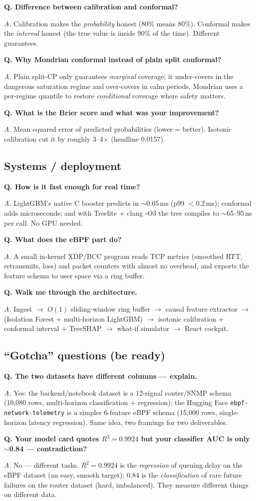 \documentclass[11pt,a4paper]{article}
\newcommand{\Q}[1]{\vspace{4pt}\noindent\textbf{Q. #1}\par\nopagebreak}
\newcommand{\A}[1]{\noindent\textit{A.} #1\par}
\begin{document}
\Q{Difference between calibration and conformal?}
\A{Calibration makes the \emph{probability} honest (80\% means 80\%). Conformal makes the \emph{interval}
honest (the true value is inside 90\% of the time). Different guarantees.}

\Q{Why Mondrian conformal instead of plain split conformal?}
\A{Plain split-CP only guarantees \emph{marginal} coverage; it under-covers in the dangerous saturation regime
and over-covers in calm periods. Mondrian uses a per-regime quantile to restore \emph{conditional} coverage
where safety matters.}

\Q{What is the Brier score and what was your improvement?}
\A{Mean squared error of predicted probabilities (lower = better). Isotonic calibration cut it by roughly
3--4$\times$ (headline 0.0157).}

\subsection{Systems / deployment}
\Q{How is it fast enough for real time?}
\A{LightGBM's native C booster predicts in $\sim$0.05\,ms (p99 $<$0.2\,ms); conformal adds microseconds;
and with Treelite + clang -O3 the tree compiles to $\sim$65--95\,ns per call. No GPU needed.}

\Q{What does the eBPF part do?}
\A{A small in-kernel XDP/BCC program reads TCP metrics (smoothed RTT, retransmits, loss) and packet counters
with almost no overhead, and exports the feature schema to user space via a ring buffer.}

\Q{Walk me through the architecture.}
\A{Ingest $\rightarrow$ $O(1)$ sliding-window ring buffer $\rightarrow$ causal feature extractor $\rightarrow$
(Isolation Forest + multi-horizon LightGBM) $\rightarrow$ isotonic calibration + conformal interval +
TreeSHAP $\rightarrow$ what-if simulator $\rightarrow$ React cockpit.}

\subsection{``Gotcha'' questions (be ready)}
\Q{The two datasets have different columns --- explain.}
\A{Yes: the backend/notebook dataset is a 12-signal router/SNMP schema (10{,}080 rows, multi-horizon
classification + regression); the Hugging Face \texttt{ebpf-network-telemetry} is a simpler 6-feature eBPF
schema (15{,}000 rows, single-horizon latency regression). Same idea, two framings for two deliverables.}

\Q{Your model card quotes $R^2=0.9924$ but your classifier AUC is only $\sim$0.84 --- contradiction?}
\A{No --- different tasks. $R^2=0.9924$ is the \emph{regression} of queuing delay on the eBPF dataset
(an easy, smooth target); 0.84 is the \emph{classification} of rare future failures on the router dataset
(hard, imbalanced). They measure different things on different data.}
\end{document}

